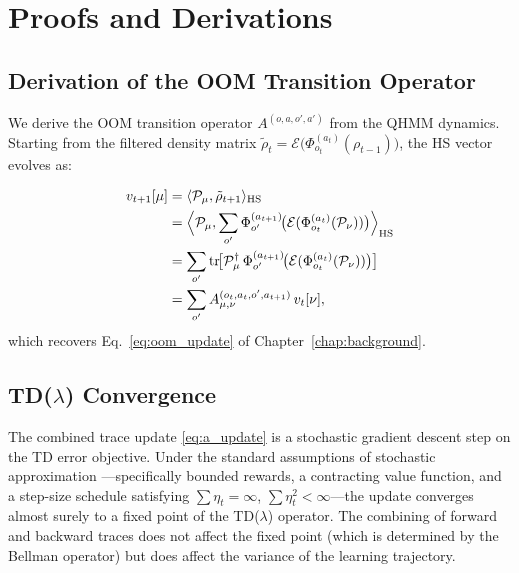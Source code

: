 
\chapter{Proofs and Derivations}
\label{app:proofs}

\section{Derivation of the OOM Transition Operator}

We derive the OOM transition operator $A^{(o,a,o',a')}$ from the
QHMM dynamics. Starting from the filtered density matrix
$\tilde\rho_t = \mathcal{E}\bigl(\Phi^{(a_t)}_{o_t}(\rho_{t-1})\bigr)$,
the HS vector evolves as:

\begin{align}
v_{t+1}[\mu]
  &= \langle \mathcal{P}_\mu, \tilde\rho_{t+1} \rangle_{\mathrm{HS}} \\
  &= \Bigl\langle \mathcal{P}_\mu,
      \sum_{o'} \Phi^{(a_{t+1})}_{o'} \!\bigl(
        \mathcal{E}(\Phi^{(a_t)}_{o_t}(\mathcal{P}_\nu)) \bigr)
    \Bigr\rangle_{\mathrm{HS}} \\
  &= \sum_{o'} \operatorname{tr}\!\bigl[
      \mathcal{P}_\mu^\dagger \,
      \Phi^{(a_{t+1})}_{o'} \!\bigl(
        \mathcal{E}(\Phi^{(a_t)}_{o_t}(\mathcal{P}_\nu)) \bigr)
    \bigr] \\
  &= \sum_{o'} A^{(o_t,a_t,o',a_{t+1})}_{\mu,\nu} \, v_t[\nu],
\end{align}
which recovers Eq.\ \eqref{eq:oom_update} of Chapter~\ref{chap:background}.


\section{TD($\lambda$) Convergence}

The combined trace update \eqref{eq:a_update} is a stochastic gradient
descent step on the TD error objective. Under the standard assumptions of
stochastic approximation \citep{sutton2000review}—specifically bounded
rewards, a contracting value function, and a step-size schedule satisfying
$\sum \eta_t = \infty$, $\sum \eta_t^2 < \infty$—the update converges
almost surely to a fixed point of the TD($\lambda$) operator. The
combining of forward and backward traces does not affect the fixed point
(which is determined by the Bellman operator) but does affect the
variance of the learning trajectory.

